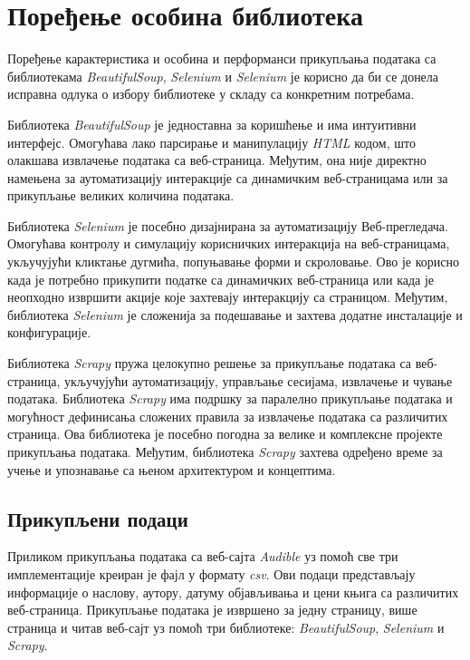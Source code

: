 \documentclass[12pt,oneside]{memoir}
\begin{document}
\chapter{Поређење особина библиотека}
\label{chp:poredjenje}
Поређење карактеристика и особина и перформанси прикупљања података са библиотекама \textit{BeautifulSoup}, \textit{Selenium} и \textit{Selenium} је корисно да би се донела исправна одлука о избору библиотеке у складу са конкретним потребама.

Библиотека \textit{BeautifulSoup} је једноставна за коришћење и има интуитивни интерфејс. Омогућава лако парсирање и манипулацију \textit{HTML} кодом, што олакшава извлачење података са веб-страница. Међутим, она није директно намењена за аутоматизацију интеракције са динамичким веб-страницама или за прикупљање великих количина података.

Библиотека \textit{Selenium} је посебно дизајнирана за аутоматизацију Веб-прегледача. Омогућава контролу и симулацију корисничких интеракција на веб-страницама, укључујући кликтање дугмића, попуњавање форми и скроловање. Ово је корисно када је потребно прикупити податке са динамичких веб-страница или када је неопходно извршити акције које захтевају интеракцију са страницом. Међутим, библиотека \textit{Selenium} је сложенија за подешавање и захтева додатне инсталације и конфигурације.

Библиотека \textit{Scrapy} пружа целокупно решење за прикупљање података са веб-страница, укључујући аутоматизацију, управљање сесијама, извлачење и чување података. Библиотека \textit{Scrapy} има подршку за паралелно прикупљање података и могућност дефинисања сложених правила за извлачење података са различитих страница. Ова библиотека је посебно погодна за велике и комплексне пројекте прикупљања података. Међутим, библиотека \textit{Scrapy} захтева одређено време за учење и упознавање са њеном архитектуром и концептима.

\section{Прикупљени подаци}
Приликом прикупљања података са веб-сајта \textit{Audible} уз помоћ све три имплементације креиран је фајл у формату \textit{csv}. Ови подаци представљају информације о наслову, аутору, датуму објављивања и цени књига са различитих веб-страница. Прикупљање података је извршено за једну страницу, више страница и читав веб-сајт уз помоћ три библиотеке: \textit{BeautifulSoup}, \textit{Selenium} и \textit{Scrapy}.
\end{document}
